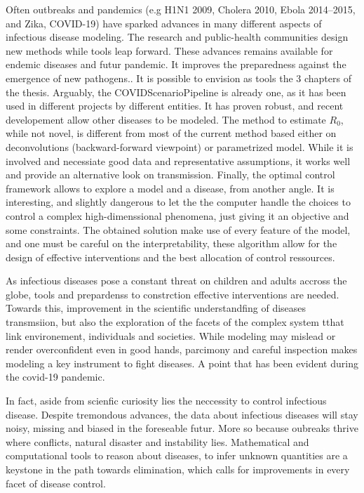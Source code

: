 Often outbreaks and pandemics (e.g H1N1 2009, Cholera 2010, Ebola 2014--2015, and Zika, COVID-19) have sparked advances in many different aspects of infectious disease modeling. The research and public-health communities design new methods while tools leap forward. These advances remains available for endemic diseases and futur pandemic. It improves the preparedness  against the emergence of new pathogens.. It is possible to envision as tools the 3 chapters of the thesis. Arguably, the COVIDScenarioPipeline is already one, as it has been used in different projects by different entities. It has proven robust, and recent developement allow other diseases to be modeled. The method to estimate $R_0$, while not novel, is different from most of the current method based either on deconvolutions (backward-forward viewpoint) or parametrized model. While it is involved and necessiate good data and representative assumptions, it works well and provide an alternative look on transmission.
Finally, the optimal control framework allows to explore a model and a disease, from another angle. It is interesting, and slightly dangerous to let the the computer handle the choices to control a complex high-dimenssional  phenomena, just giving it an objective and some constraints. The obtained solution make use of every feature of the model, and one must be careful on the interpretability, these algorithm allow for the design of effective interventions and the best allocation of control ressources. 

As infectious diseases pose a constant threat on children and adults accross the globe, tools and prepardenss to constrction effective interventions are needed. Towards this, improvement in the scientific understandfing of diseases transmsiion, but also the exploration of the facets of the complex system tthat link environement, individuals and societies. While modeling may mislead or render overconfident even in good hands, parcimony and careful inspection makes modeling a key instrument to fight diseases. A point that has been evident during the covid-19 pandemic.

In fact, aside from scienfic curiosity lies the neccessity to control infectious disease. Despite tremondous advances, the data about infectious diseases will stay noisy, missing and biased in the foreseable futur. More so because oubreaks thrive where conflicts, natural disaster and instability lies. Mathematical and computational tools to reason about diseases, to infer unknown quantities are a keystone in the path towards elimination, which calls for improvements in every facet of disease control. 

